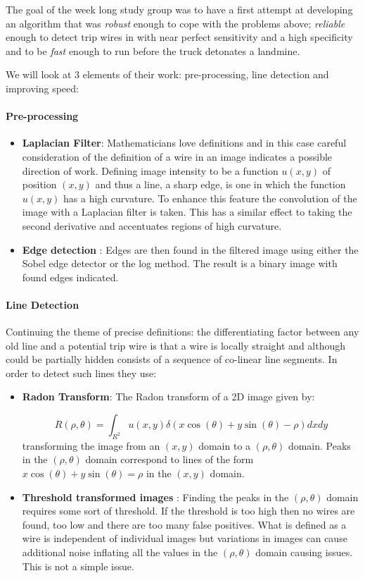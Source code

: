 \documentclass[11pt]{article} %
\begin{document}
	The goal of the week long study group was to have a first attempt at developing an algorithm that was \textsl{robust} enough to cope with the problems above; \textit{reliable }enough to detect trip wires in with near perfect sensitivity and a high specificity and to be \textit{fast} enough to run before the truck detonates a landmine. 
	
	We will look at 3 elements of their work: pre-processing, line detection and improving speed:
	\paragraph{Pre-processing}
\begin{itemize}
	\item \textbf{Laplacian Filter}: Mathematicians love definitions and in this case careful consideration of the definition of a wire in an image indicates a possible direction of work. Defining image intensity to be a function $u(x,y)$ of position $(x,y)$ and thus a line, a sharp edge, is one in which the function $u(x,y) $ has a high curvature.
	To enhance this feature the convolution of the image with a Laplacian filter is taken. This has a similar effect to taking the second derivative and accentuates regions of high curvature.	
	\item \textbf{Edge detection }: Edges are then found in the filtered image using either the Sobel edge detector or the log method. The result is a binary image with found edges indicated. 
	\end{itemize}
	
	\paragraph{Line Detection}
	Continuing the theme of precise definitions: the differentiating factor between any old line and a potential trip wire is that a wire is locally straight and although could be partially hidden consists of a sequence of co-linear line segments. In order to detect such lines they use: 
		\begin{itemize}
		\item \textbf{Radon Transform}: The Radon transform of a 2D image given by:
		
		\begin{equation}
			R(\rho, \theta)=\int_{R^2} u(x,y)\delta(x\cos(\theta)+y\sin(\theta)-\rho) dx dy 					
		\end{equation}
		transforming the image from an $(x,y) $ domain to a $ (\rho, \theta)$ domain. Peaks in the $ (\rho, \theta)$ domain correspond to lines of the form $ x\cos(\theta)+y\sin(\theta)=\rho$ in the $(x,y) $ domain. 
		\item \textbf{Threshold transformed images }: Finding the peaks in the $ (\rho, \theta)$ domain requires some sort of threshold. If the threshold is too high then no wires are found, too low and there are too many false positives. What is defined as a wire is independent of individual images but variations in images can cause additional noise inflating all the values in the $ (\rho, \theta)$ domain causing issues. This is not a simple issue. 
	\end{itemize}
\end{document}
